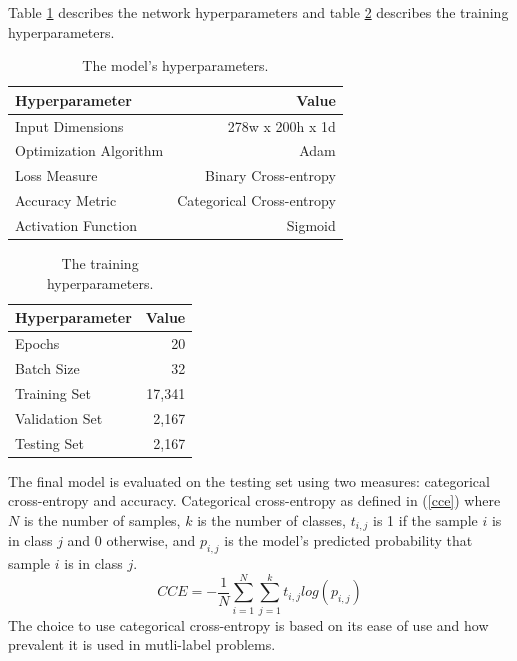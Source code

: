 \documentclass[conference]{IEEEtran}
\begin{document}
Table \ref{modelHyperparams} describes the network hyperparameters and table \ref{trainHyperparams} describes the training hyperparameters.

\bgroup
\def\arraystretch{2}
\begin{table}[h!]
	\centering
	\caption{The model's hyperparameters.}
	\label{modelHyperparams}
	{%
		\begin{tabular}{|l|r|}
			\hline
			\textbf{Hyperparameter} & \textbf{Value} \\ \hline
			\rowcolor[HTML]{F6F8FA} 
			Input Dimensions & 278w x 200h x 1d \\ \hline
			Optimization Algorithm & Adam \\ \hline
			\rowcolor[HTML]{F6F8FA} 
			Loss Measure & Binary Cross-entropy \\ \hline
			Accuracy Metric & Categorical Cross-entropy \\ \hline
			\rowcolor[HTML]{F6F8FA} 
			Activation Function & Sigmoid \\ \hline
		\end{tabular}%
	}
\end{table}
\egroup

\bgroup
\def\arraystretch{2}
\begin{table}[h!]
	\centering
	\caption{The training hyperparameters.}
	\label{trainHyperparams}
	{%
		\begin{tabular}{|l|r|}
			\hline
			\textbf{Hyperparameter} & \textbf{Value} \\ \hline
			\rowcolor[HTML]{F6F8FA} 
			Epochs & 20 \\ \hline
			Batch Size & 32 \\ \hline
			\rowcolor[HTML]{F6F8FA} 
			Training Set & 17,341 \\ \hline
			Validation Set & 2,167 \\ \hline
			\rowcolor[HTML]{F6F8FA} 
			Testing Set & 2,167 \\ \hline
		\end{tabular}%
	}
\end{table}
\egroup

The final model is evaluated on the testing set using two measures: categorical cross-entropy and accuracy. Categorical cross-entropy as defined in (\ref{cce}) where $N$ is the number of samples, $k$ is the number of classes, $t_{i,j}$ is 1 if the sample $i$ is in class $j$ and 0 otherwise, and $p_{i,j}$ is the model's predicted probability that sample $i$ is in class $j$.
\begin{equation}
\label{cce}
CCE = -\frac{1}{N}\sum_{i=1}^{N}\sum_{j=1}^{k}t_{i,j}log(p_{i,j})
\end{equation}
The choice to use categorical cross-entropy is based on its ease of use and how prevalent it is used in mutli-label problems.
\end{document}
